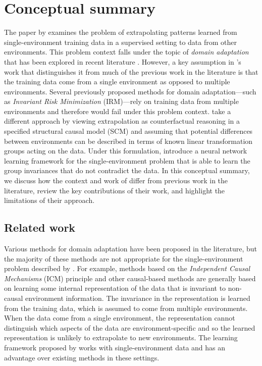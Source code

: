 

\section{Conceptual summary}\label{sec:conceptual}

The paper by \textcite{Mouli:2021} examines the problem of extrapolating patterns learned from single-environment training data in a supervised setting to data from other environments. This problem context falls under the topic of \textit{domain adaptation} that has been explored in recent literature \parencite{Farahani:2020}. However, a key assumption in \citeauthor{Mouli:2021}'s work that distinguishes it from much of the previous work in the literature is that the training data come from a single environment as opposed to multiple environments. Several previously proposed methods for domain adaptation---such as \textit{Invariant Risk Minimization} \parencite{Arjovsky:2020} (IRM)---rely on training data from multiple environments and therefore would fail under this problem context. \citeauthor{Mouli:2021} take a different approach by viewing extrapolation as counterfactual reasoning in a specified structural causal model (SCM) and assuming that potential differences between environments can be described in terms of known linear transformation groups acting on the data. Under this formulation, \citeauthor{Mouli:2021} introduce a neural network learning framework for the single-environment problem that is able to learn the group invariances that do not contradict the data. In this conceptual summary, we discuss how the context and work of \textcite{Mouli:2021} differ from previous work in the literature, review the key contributions of their work, and highlight the limitations of their approach.


\subsection{Related work}

Various methods for domain adaptation have been proposed in the literature, but the majority of these methods are not appropriate for the single-environment problem described by \textcite{Mouli:2021}. For example, methods based on the \textit{Independent Causal Mechanisms} (ICM) principle \parencite{Parascandolo:2018} and other causal-based methods are generally based on learning some internal representation of the data that is invariant to non-causal environment information. The invariance in the representation is learned from the training data, which is assumed to come from multiple environments. When the data come from a single environment, the representation cannot distinguish which aspects of the data are environment-specific and so the learned representation is unlikely to extrapolate to new environments. The learning framework proposed by \citeauthor{Mouli:2021} works with single-environment data and has an advantage over existing methods in these settings.
\\

